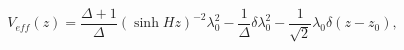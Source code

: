 \begin{equation}
V_{eff}(z) = \frac{\Delta + 1}{\Delta} (\sinh{H z})^{-2} \lambda_{0}^{2}
- \frac{1}{\Delta} \delta \lambda_{0}^{2}
- \frac{1}{\sqrt{2}} \lambda_{0} \delta(z - z_{0}),
\end{equation}

